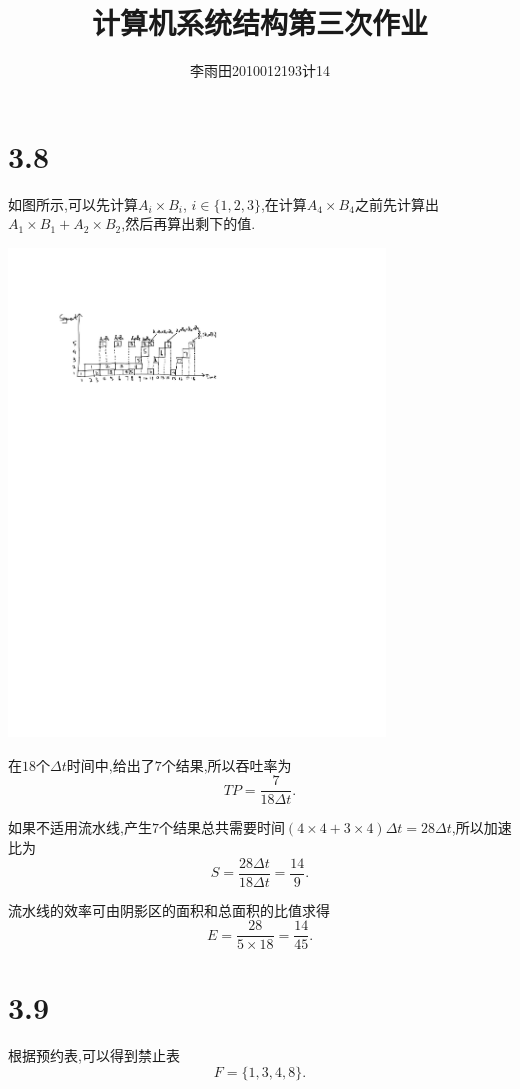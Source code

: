 \documentclass[adobefonts, nocap]{ctexart}
\begin{document}
  \title{计算机系统结构第三次作业}
  \author{李雨田\hspace{1em}2010012193\hspace{1em}计14}
  \maketitle
  \section*{3.8}
    如图所示,可以先计算$A_{i}\times B_{i}$, $i\in \{1,2,3\}$,在计算$A_{4}\times B_{4}$之前先计算出$A_{1}\times B_{1}+A_{2}\times B_{2}$,然后再算出剩下的值.

    \begin{center}
      \includegraphics[width=10cm]{1-crop.pdf}
    \end{center}

    在$18$个$\Delta t$时间中,给出了$7$个结果,所以吞吐率为
    \[
      TP=\frac{7}{18\Delta t}.
    \]

    如果不适用流水线,产生$7$个结果总共需要时间$(4\times 4+3\times 4)\Delta t=28\Delta t$,所以加速比为
    \[
      S=\frac{28\Delta t}{18\Delta t}=\frac{14}{9}.
    \]

    流水线的效率可由阴影区的面积和总面积的比值求得
    \[
      E=\frac{28}{5\times 18}=\frac{14}{45}.
    \]
  \section*{3.9}
    根据预约表,可以得到禁止表
    \[
      F=\{1,3,4,8\}.
    \]
\end{document}
